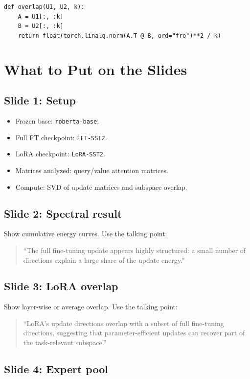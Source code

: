 \documentclass[11pt]{article}
\begin{document}
\begin{verbatim}
def overlap(U1, U2, k):
    A = U1[:, :k]
    B = U2[:, :k]
    return float(torch.linalg.norm(A.T @ B, ord="fro")**2 / k)
\end{verbatim}

\section{What to Put on the Slides}

\subsection{Slide 1: Setup}

\begin{itemize}
    \item Frozen base: \texttt{roberta-base}.
    \item Full FT checkpoint: \texttt{FFT-SST2}.
    \item LoRA checkpoint: \texttt{LoRA-SST2}.
    \item Matrices analyzed: query/value attention matrices.
    \item Compute: SVD of update matrices and subspace overlap.
\end{itemize}

\subsection{Slide 2: Spectral result}

Show cumulative energy curves. Use the talking point:
\begin{quote}
``The full fine-tuning update appears highly structured: a small number of directions explain a large share of the update energy.''
\end{quote}

\subsection{Slide 3: LoRA overlap}

Show layer-wise or average overlap. Use the talking point:
\begin{quote}
``LoRA's update directions overlap with a subset of full fine-tuning directions, suggesting that parameter-efficient updates can recover part of the task-relevant subspace.''
\end{quote}

\subsection{Slide 4: Expert pool}
\end{document}
